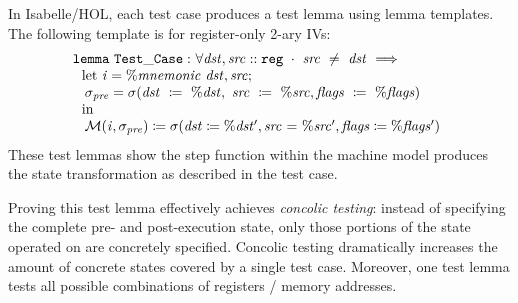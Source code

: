 In Isabelle/HOL, each test case produces a test lemma using lemma templates.
The following template is for register-only 2-ary IVs:
\[
\mbox{\hspace{-1ex}}
\begin{array}{lcll}
\mathtt{lemma~Test\_Case:~} \forall \var{dst}, \var{src} :: \mathtt{reg}~\cdot~ \var{src} ~\neq~ \var{dst}~ \Longrightarrow \\ %
	\hspace{1,5ex}\mbox{let}~ \var{i} = \%\var{mnemonic}~\var{dst}, \var{src}; \\
	\hspace{2ex} \sigma_\var{pre}=\sigma(\var{dst}~\coloneqq~\var{\%dst},~\var{src}~\coloneqq~\var{\%src}, \var{flags}~\coloneqq~\var{\%flags})\\
	\hspace{1.5ex}\mbox{in}~\\
	\hspace{2ex}\mathcal{M}(\var{i},\sigma_\var{pre})\hspace{0.0ex}\coloneqq\hspace{0.0ex}\sigma(\var{dst}\hspace{0.0ex}\coloneqq\hspace{0.0ex}\var{\%dst'},\var{src}~\mbox{=}~\var{\%src'}, \var{flags}\hspace{0.0ex}\coloneqq\hspace{0.0ex}\var{\%flags'})
\end{array}
\]
These test lemmas show the step function within the machine model produces the state transformation as described in the test case.

Proving this test lemma effectively achieves \emph{concolic testing}: instead of specifying the complete pre- and post-execution state, only those portions of the state operated on are concretely specified.
Concolic testing dramatically increases the amount of concrete states covered by a single test case.
Moreover, one test lemma tests all possible combinations of registers / memory addresses.

